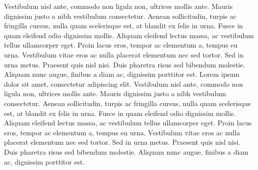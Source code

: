 Vestibulum nisl ante, commodo non ligula non, ultrices mollis ante. Mauris dignissim justo a nibh vestibulum consectetur. Aenean sollicitudin, turpis ac fringilla cursus, nulla quam scelerisque est, at blandit ex felis in urna. Fusce in quam eleifend odio dignissim mollis. Aliquam eleifend lectus massa, ac vestibulum tellus ullamcorper eget. Proin lacus eros, tempor ac elementum a, tempus eu urna. Vestibulum vitae eros ac nulla placerat elementum nec sed tortor. Sed in urna metus. Praesent quis nisl nisi. Duis pharetra risus sed bibendum molestie. Aliquam nunc augue, finibus a diam ac, dignissim porttitor est.
Lorem ipsum dolor sit amet, consectetur adipiscing elit. Vestibulum nisl ante, commodo non ligula non, ultrices mollis ante. Mauris dignissim justo a nibh vestibulum consectetur. Aenean sollicitudin, turpis ac fringilla cursus, nulla quam scelerisque est, at blandit ex felis in urna. Fusce in quam eleifend odio dignissim mollis. Aliquam eleifend lectus massa, ac vestibulum tellus ullamcorper eget. Proin lacus eros, tempor ac elementum a, tempus eu urna. Vestibulum vitae eros ac nulla placerat elementum nec sed tortor. Sed in urna metus. Praesent quis nisl nisi. Duis pharetra risus sed bibendum molestie. Aliquam nunc augue, finibus a diam ac, dignissim porttitor est.